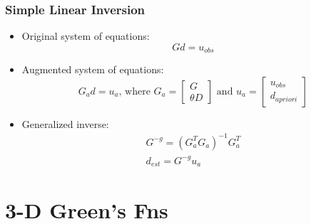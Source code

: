 \documentclass{beamer}
\begin{document}
\begin{frame}
  \frametitle{Simple Linear Inversion}

  \begin{itemize}
  \item Original system of equations:
    \begin{equation}
      G d = u_{obs}
    \end{equation}

  \item Augmented system of equations:
    \begin{equation}
      G_a d = u_a \text{, where } 
      G_a = \left[ \begin{array}{c} G \\ \theta D \end{array} \right]
      \text{ and }
      u_a = \left[ \begin{array}{c} u_{obs} \\ d_{apriori} \end{array} \right]
    \end{equation}
    
  \item Generalized inverse:
    \begin{gather}
      G^{-g} = \left( G_a^T G_a \right)^{-1} G_a^T \\
      d_{est} = G^{-g} u_a
    \end{gather}
  \end{itemize}
  
\end{frame}


\section{3-D Green's Fns}
\end{document}
